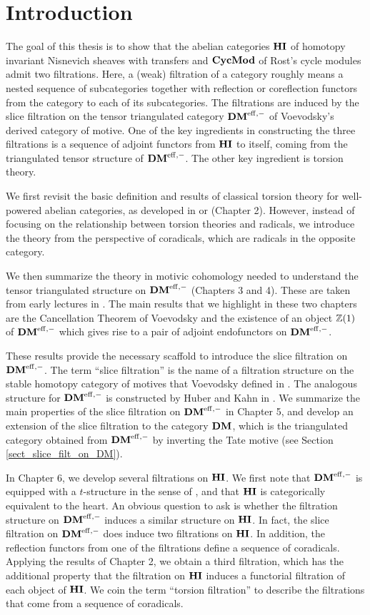 \chapter{Introduction} 

The goal of this thesis is to show that the abelian categories 
$\mathbf{HI}$ of homotopy invariant Nisnevich sheaves with transfers and 
$\mathbf{CycMod}$ of Rost's cycle modules admit two filtrations. 
Here, a (weak) filtration of a category roughly means a nested sequence of 
subcategories together with reflection or coreflection functors 
from the category to each of its subcategories. The filtrations 
are induced by the slice filtration on the tensor triangulated 
category $\mathbf{DM}^{\mathrm{eff},-}$ of Voevodsky's derived category of motive. One 
of the key ingredients in constructing the three filtrations is a 
sequence of adjoint functors from $\mathbf{HI}$ to itself, coming from the 
triangulated tensor structure of $\mathbf{DM}^{\mathrm{eff},-}$. The other key 
ingredient is torsion theory.
 
We first revisit the basic definition and results of classical 
torsion theory for well-powered abelian categories, as developed 
in \cite{BJV} or \cite{DTor} (Chapter 2). However, instead of focusing
on the relationship between torsion theories and radicals, we
introduce the theory from the perspective of coradicals, which are 
radicals in the opposite category.  

We then summarize the theory in motivic cohomology needed to 
understand the tensor triangulated structure on $\mathbf{DM}^{\mathrm{eff},-}$ 
(Chapters 3 and 4). These are taken from early lectures in 
\cite{MVW}. The main results that we highlight in these two 
chapters are the Cancellation Theorem of Voevodsky and the
existence of an object $\mathbb{Z}(1)$ of $\mathbf{DM}^{\mathrm{eff},-}$ which gives rise to a pair of 
adjoint endofunctors on $\mathbf{DM}^{\mathrm{eff},-}$. 

These results provide the necessary scaffold to introduce the 
slice filtration on $\mathbf{DM}^{\mathrm{eff},-}$. The term ``slice filtration'' is the
name of a filtration structure on the stable homotopy category 
of motives that Voevodsky defined in \cite{VOP}. The analogous
structure for $\mathbf{DM}^{\mathrm{eff},-}$ is constructed by Huber and Kahn in 
\cite{HuKa}. We summarize the main properties of the slice 
filtration on $\mathbf{DM}^{\mathrm{eff},-}$ in Chapter 5, and develop an extension of
the slice filtration to the category $\mathbf{DM}$, which is the
triangulated category obtained from $\mathbf{DM}^{\mathrm{eff},-}$ by inverting the
Tate motive (see Section \ref{sect_slice_filt_on_DM}).

In Chapter 6, we develop several filtrations on
$\mathbf{HI}$. We first note that $\mathbf{DM}^{\mathrm{eff},-}$ is equipped with a 
$t$-structure in the sense of \cite{BBD}, and that $\mathbf{HI}$ is categorically
equivalent to the heart. An obvious question to ask is whether the
filtration structure on $\mathbf{DM}^{\mathrm{eff},-}$ induces a similar structure on
$\mathbf{HI}$. In fact, the slice filtration on $\mathbf{DM}^{\mathrm{eff},-}$ does induce two
filtrations on $\mathbf{HI}$. In addition, the reflection functors from
one of the filtrations define a sequence of coradicals. Applying
the results of Chapter 2, we obtain a third filtration, which has
the additional property that the filtration on $\mathbf{HI}$ induces a 
functorial filtration of each object of $\mathbf{HI}$. We coin the
term ``torsion filtration'' to describe the filtrations that
come from a sequence of coradicals.

